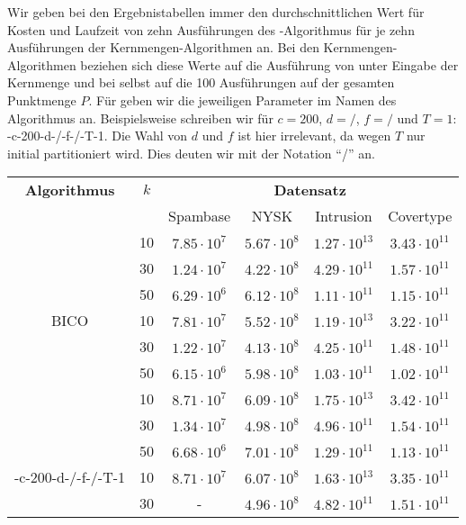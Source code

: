 Wir geben bei den Ergebnistabellen immer den durchschnittlichen Wert für Kosten und Laufzeit von zehn
Ausführungen des \kmpp-Algorithmus für je zehn Ausführungen der Kernmengen-Algorithmen an. Bei den Kernmengen-Algorithmen
beziehen sich diese Werte auf die Ausführung von \kmpp{} unter
Eingabe der Kernmenge und bei \kmpp{} selbst auf die 100 Ausführungen auf der gesamten Punktmenge $P$. Für \CsTwo{} geben wir die
jeweiligen Parameter im Namen des Algorithmus an. Beispielsweise schreiben wir für $c = 200$, $d=/$, $f=/$ und $T=1$:
\CsTwo-c-200-d-/-f-/-T-1. Die Wahl von $d$ und $f$ ist hier irrelevant, da wegen $T$ nur initial partitioniert wird.
Dies deuten wir mit der Notation "`/"' an.
\begin{table}[h]
\centering
\begin{tabular}{@{}cccccc@{}} \toprule
	\textbf{Algorithmus} & $k$ & \multicolumn{4}{c}{\textbf{Datensatz}} \\
	\cmidrule(r){3-6} & 		& Spambase 				& NYSK 				& Intrusion 			& Covertype \\ \toprule
	\Skmpp 						& 10 & $7.85 \cdot 10^7$ & $5.67 \cdot 10^8$ & $1.27 \cdot 10^{13}$ & $3.43 \cdot 10^{11}$ \\
		 						& 30 & $1.24 \cdot 10^7$ & $4.22 \cdot 10^8$ & $4.29 \cdot 10^{11}$ & $1.57 \cdot 10^{11}$ \\
		 						& 50 & $6.29 \cdot 10^6$ & $6.12 \cdot 10^8$ & $1.11 \cdot 10^{11}$ & $1.15 \cdot 10^{11}$ \\
	\midrule
	BICO 						& 10 & $7.81 \cdot 10^7$ & $5.52 \cdot 10^8$ & $1.19 \cdot 10^{13}$ & $3.22 \cdot 10^{11}$ \\
			 					& 30 & $1.22 \cdot 10^7$ & $4.13 \cdot 10^8$ & $4.25 \cdot 10^{11}$ & $1.48 \cdot 10^{11}$ \\
		 						& 50 & $6.15 \cdot 10^6$ & $5.98 \cdot 10^8$ & $1.03 \cdot 10^{11}$ & $1.02 \cdot 10^{11}$ \\
	\midrule
	\kmpp 						& 10 & $8.71 \cdot 10^7$ & $6.09 \cdot 10^8$ & $1.75 \cdot 10^{13}$ & $3.42 \cdot 10^{11}$ \\
			 					& 30 & $1.34 \cdot 10^7$ & $4.98 \cdot 10^8$ & $4.96 \cdot 10^{11}$ & $1.54 \cdot 10^{11}$ \\
		 						& 50 & $6.68 \cdot 10^6$ & $7.01 \cdot 10^8$ & $1.29 \cdot 10^{11}$ & $1.13 \cdot 10^{11}$ \\
	\midrule
	\CsTwo-c-200-d-/-f-/-T-1	& 10 & $8.71 \cdot 10^7$ & $6.07 \cdot 10^8$ & $1.63 \cdot 10^{13}$ & $3.35 \cdot 10^{11}$ \\
			 					& 30 & - 				& $4.96 \cdot 10^8$ & $4.82 \cdot 10^{11}$ & $1.51 \cdot 10^{11}$ \\

\end{tabular}
\end{table}
